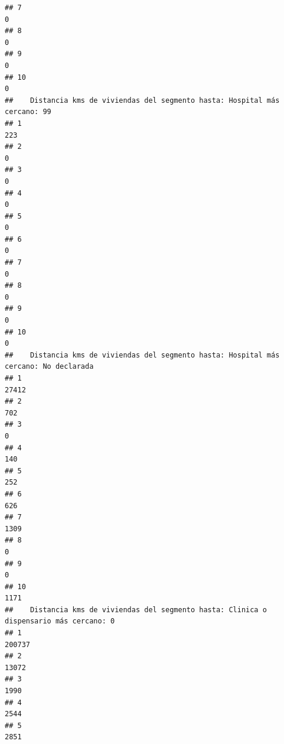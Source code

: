 \documentclass[11pt,]{article}
\begin{document}
\begin{verbatim}
## 7                                                                        0
## 8                                                                        0
## 9                                                                        0
## 10                                                                       0
##    Distancia kms de viviendas del segmento hasta: Hospital más cercano: 99
## 1                                                                      223
## 2                                                                        0
## 3                                                                        0
## 4                                                                        0
## 5                                                                        0
## 6                                                                        0
## 7                                                                        0
## 8                                                                        0
## 9                                                                        0
## 10                                                                       0
##    Distancia kms de viviendas del segmento hasta: Hospital más cercano: No declarada
## 1                                                                              27412
## 2                                                                                702
## 3                                                                                  0
## 4                                                                                140
## 5                                                                                252
## 6                                                                                626
## 7                                                                               1309
## 8                                                                                  0
## 9                                                                                  0
## 10                                                                              1171
##    Distancia kms de viviendas del segmento hasta: Clinica o dispensario más cercano: 0
## 1                                                                               200737
## 2                                                                                13072
## 3                                                                                 1990
## 4                                                                                 2544
## 5                                                                                 2851

\end{verbatim}
\end{document}
